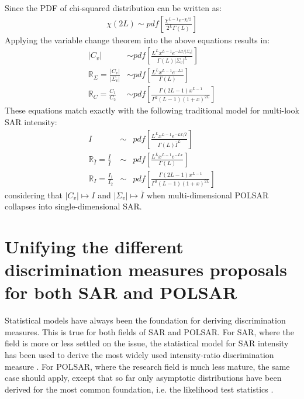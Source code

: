 \documentclass[journal]{IEEEtran}
\begin{document}
Since the PDF of chi-squared distribution can be written as:
\begin{align*}
\chi(2L) \sim pdf \left[ \frac{\chi^{L-1}e^{-\chi/2}}{2^L\Gamma(L)} \right]
\end{align*}
Applying the variable change theorem into the above equations results in:
\begin{align*}
  |C_v| &\sim  pdf \left[ \frac{L^L x^{L-1} e^{-Lx/|\Sigma_v|}}{\Gamma(L) |\Sigma_v|^L} \right] \\ %
  \mathbb{R}_{\Sigma} = \frac{|C_v|}{|\Sigma_v|} &\sim pdf \left[ \frac{ L^{L} x^{L-1} e^{-Lx}}{ \Gamma(L)} \right] \\ %
  \mathbb{R}_{C} = \frac{C_1}{C_2} &\sim pdf \left[ \frac{\Gamma(2L-1) x^{L-1}}{\Gamma^2(L-1) (1+x)^{2L}} \right]
\end{align*}
These equations match exactly with the following traditional model for multi-look SAR intensity:
  \begin{eqnarray}
I &\sim& pdf \left[ \frac{L^L x^{L-1} e^{-Lx/\bar{I}}}{\Gamma(L) \bar{I}^L} \right] \\
\mathbb{R}_{\bar{I}} = \frac{I}{\bar{I}} &\sim& pdf \left[ \frac{ L^{L} x^{L-1} e^{-Lx}}{ \Gamma(L)} \label{eqn:multi_look_SAR_ratio_dist} \right] \\
  \mathbb{R}_{I} = \frac{I_1}{I_2} &\sim& pdf \left[ \frac{\Gamma(2L-1) x^{L-1}}{\Gamma^2(L-1) (1+x)^{2L}} \right]
  \end{eqnarray}
considering that $|C_v| \mapsto I$ and $|\Sigma_v| \mapsto \bar{I}$ when multi-dimensional POLSAR collapses into single-dimensional SAR.

\section{Unifying the different discrimination measures proposals for both SAR and POLSAR}
\label{sec:link_sar_polsar}

Statistical models have always been the foundation for deriving discrimination measures.
This is true for both fields of SAR and POLSAR.
For SAR, where the field is more or less settled on the issue,
  the statistical model for SAR intensity has been used to derive the most widely used intensity-ratio discrimination measure \cite{Rignot_1993_TGRS_896}.
For POLSAR, where the research field is much less mature,
  the same case should apply, 
  except that so far only asymptotic distributions have been derived for the most common foundation, i.e. the likelihood test statistics \cite{Conradsen_2003_TGRS_4}.
\end{document}
